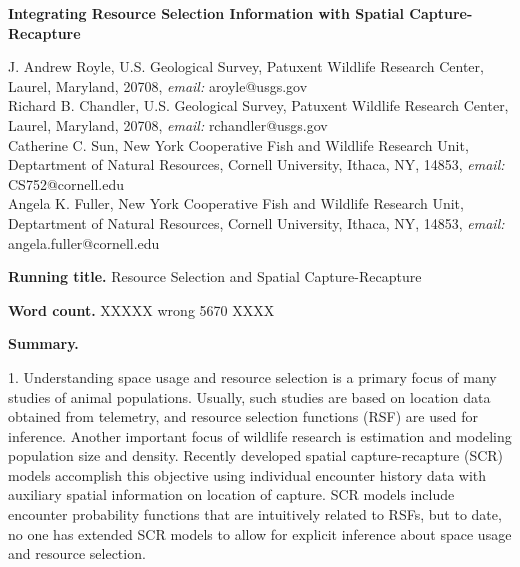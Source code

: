 \documentclass[12pt]{article}
\begin{document}
\begin{center}
\Large \textbf{
Integrating
Resource Selection Information with Spatial Capture-Recapture
}
\end{center}
%


\noindent J. Andrew Royle, U.S. Geological Survey, Patuxent
Wildlife Research Center, Laurel, Maryland, 20708,
\emph{email:} aroyle@usgs.gov \\

\noindent Richard B. Chandler,  U.S. Geological Survey, Patuxent
Wildlife Research Center, Laurel, Maryland, 20708,
\emph{email:} rchandler@usgs.gov \\

\noindent Catherine C.  Sun, New York Cooperative Fish and Wildlife
Research Unit, Deptartment of Natural Resources, Cornell
University, Ithaca, NY, 14853,
\emph{email:} CS752@cornell.edu \\

\noindent Angela K. Fuller, New York Cooperative Fish and Wildlife
Research Unit, Deptartment of Natural Resources, Cornell
University, Ithaca, NY, 14853,
\emph{email:} angela.fuller@cornell.edu \\

\vspace{.2in}

{\bf Running title.} Resource Selection and Spatial Capture-Recapture

\vspace{.2in}

{\bf Word count.} XXXXX wrong 5670 XXXX

\vspace{.2in}

{\bf Summary.}

1.
Understanding space usage and resource selection is a primary focus of
many studies of animal populations. Usually, such studies are based on
location data obtained from telemetry,
and resource selection functions (RSF) are used for inference.
Another important focus of wildlife research is estimation and
modeling population size and density.
Recently developed spatial capture-recapture (SCR) models accomplish this objective
using individual encounter history data with auxiliary spatial information
on location of capture. SCR models include %
encounter probability functions that %
are intuitively related to RSFs, but %
to date, no one has extended
SCR models to allow for explicit inference about
space usage and resource selection.
\end{document}
